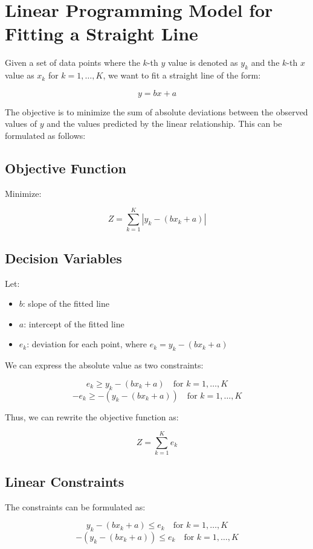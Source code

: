 \documentclass{article}
\begin{document}
\section*{Linear Programming Model for Fitting a Straight Line}

Given a set of data points where the \( k \)-th \( y \) value is denoted as \( y_k \) and the \( k \)-th \( x \) value as \( x_k \) for \( k = 1, \ldots, K \), we want to fit a straight line of the form:

\[
y = bx + a
\]

The objective is to minimize the sum of absolute deviations between the observed values of \( y \) and the values predicted by the linear relationship. This can be formulated as follows:

\subsection*{Objective Function}
Minimize:

\[
Z = \sum_{k=1}^{K} |y_k - (bx_k + a)|
\]

\subsection*{Decision Variables}
Let:
\begin{itemize}
    \item \( b \): slope of the fitted line
    \item \( a \): intercept of the fitted line
    \item \( e_k \): deviation for each point, where \( e_k = y_k - (bx_k + a) \)
\end{itemize}

We can express the absolute value as two constraints:

\[
e_k \geq y_k - (bx_k + a) \quad \text{for } k = 1, \ldots, K
\]
\[
-e_k \geq -(y_k - (bx_k + a)) \quad \text{for } k = 1, \ldots, K
\]

Thus, we can rewrite the objective function as:

\[
Z = \sum_{k=1}^{K} e_k
\]

\subsection*{Linear Constraints}
The constraints can be formulated as:

\[
y_k - (bx_k + a) \leq e_k \quad \text{for } k = 1, \ldots, K
\]
\[
-(y_k - (bx_k + a)) \leq e_k \quad \text{for } k = 1, \ldots, K
\]
\end{document}
